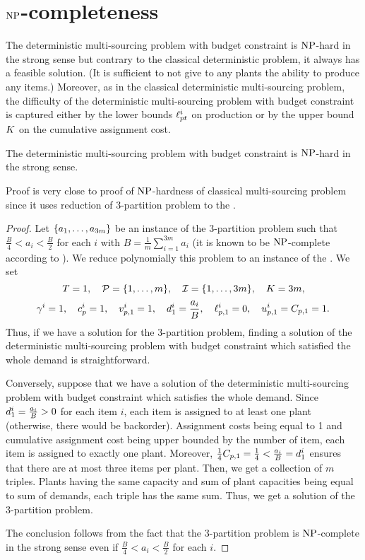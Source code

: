 \section{$\operatorname{NP}$-completeness}
\label{sec:multi-sourcing-limited-capital:NP-completeness}


The deterministic multi-sourcing problem with budget constraint is $\operatorname{NP}$-hard in the strong sense but contrary to the classical deterministic problem, it always has a feasible solution.
(It is sufficient to not give to any plants the ability to produce any items.)
Moreover, as in the classical deterministic multi-sourcing problem, the difficulty of the deterministic multi-sourcing problem with budget constraint is captured either by the lower bounds $\ell_{pt}^i$ on production or by the upper bound $K$ on the cumulative assignment cost.


\begin{thm}\label{thm:det-multi-sourcing:limited-capital:strong-NP-hard}
  The deterministic multi-sourcing problem with budget constraint is $\operatorname{NP}$-hard in the strong sense.
\end{thm}


Proof is very close to proof of $\operatorname{NP}$-hardness of classical multi-sourcing problem since it uses reduction of 3-partition problem to the \tbc.


\begin{proof}
Let $\crbracket{a_1,\ldots,a_{3m}}$ be an instance of the 3-partition problem such that $\frac{B}{4} < a_i < \frac{B}{2}$ for each $i$ with $B=\frac{1}{m}\sum_{i=1}^{3m}a_i$ (it is known to be $\operatorname{NP}$-complete according to \citet{Garey1979}).
We reduce polynomially this problem to an instance of the \tbc.
We set
$$
  \horizon=1
  ,\quad
  \plants=\range[1]{m}
  ,\quad
  \REF=\range[1]{3m}
  ,\quad
  \capital = 3m,
$$
$$
  \gamma^i=1
  ,\quad
  c_p^i=1
  ,\quad
  v_{p,1}^i=1
  ,\quad
  d_1^i=\frac{a_i}{B}
  ,\quad
  \ell_{p,1}^i=0
  ,\quad
  u_{p,1}^i=C_{p,1}=1.
$$
Thus, if we have a solution for the 3-partition problem, finding a solution of the deterministic multi-sourcing problem with budget constraint which satisfied the whole demand is straightforward.

Conversely, suppose that we have a solution of the deterministic multi-sourcing problem with budget constraint which satisfies the whole demand.
Since $d_1^i=\frac{a_i}{B}>0$ for each item $i$, each item is assigned to at least one plant (otherwise, there would be backorder).
Assignment costs being equal to 1 and cumulative assignment cost being upper bounded by the number of item, each item is assigned to exactly one plant.
Moreover, $\frac{1}{4}C_{p,1}=\frac{1}{4} < \frac{a_i}{B}=d_1^i$ ensures that there are at most three items per plant.
Then, we get a collection of $m$ triples.
Plants having the same capacity and sum of plant capacities being equal to sum of demands, each triple has the same sum.
Thus, we get a solution of the 3-partition problem.

The conclusion follows from the fact that the 3-partition problem is $\operatorname{NP}$-complete in the strong sense even if $\frac{B}{4} < a_i < \frac{B}{2}$ for each $i$.
\end{proof}


